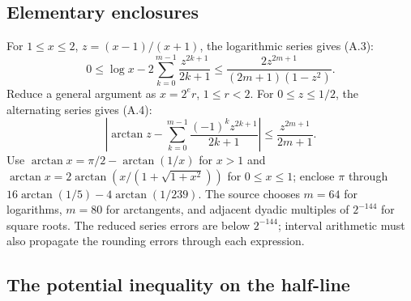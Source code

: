 \subsection{Elementary enclosures}

For $1\le x\le2$, $z=(x-1)/(x+1)$, the logarithmic series gives (A.3):
\[
 0\le\log x-2\sum_{k=0}^{m-1}\frac{z^{2k+1}}{2k+1}
       \le\frac{2z^{2m+1}}{(2m+1)(1-z^2)}.
\]
Reduce a general argument as $x=2^er$, $1\le r<2$.  For
$0\le z\le1/2$, the alternating series gives (A.4):
\[
 \left|\arctan z-\sum_{k=0}^{m-1}
                  \frac{(-1)^kz^{2k+1}}{2k+1}\right|
       \le\frac{z^{2m+1}}{2m+1}.
\]
Use $\arctan x=\pi/2-\arctan(1/x)$ for $x>1$ and
$\arctan x=2\arctan(x/(1+\sqrt{1+x^2}))$ for $0\le x\le1$;
enclose $\pi$ through $16\arctan(1/5)-4\arctan(1/239)$.
The source chooses $m=64$ for logarithms, $m=80$ for arctangents,
and adjacent dyadic multiples of $2^{-144}$ for square roots.
The reduced series errors are below $2^{-144}$; interval arithmetic
must also propagate the rounding errors through each expression.

\subsection{The potential inequality on the half-line}

